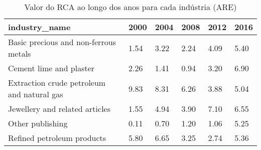 \begin{table}
\centering
\caption{Valor do RCA ao longo dos anos para cada indústria (ARE)}
\begin{tabular}{p{6cm}p{1.5cm}p{1.5cm}p{1.5cm}p{1.5cm}p{1.5cm}}
\toprule
                             industry\_name & 2000 & 2004 & 2008 & 2012 & 2016 \\
\midrule
     Basic precious and non-ferrous metals & 1.54 & 3.22 & 2.24 & 4.09 & 5.40 \\
                   Cement lime and plaster & 2.26 & 1.41 & 0.94 & 3.20 & 6.90 \\
Extraction crude petroleum and natural gas & 9.83 & 8.31 & 6.26 & 3.88 & 5.04 \\
            Jewellery and related articles & 1.55 & 4.94 & 3.90 & 7.10 & 6.55 \\
                          Other publishing & 0.11 & 0.70 & 1.20 & 1.06 & 5.25 \\
                Refined petroleum products & 5.80 & 6.65 & 3.25 & 2.74 & 5.36 \\
\bottomrule
\end{tabular}
\end{table}
